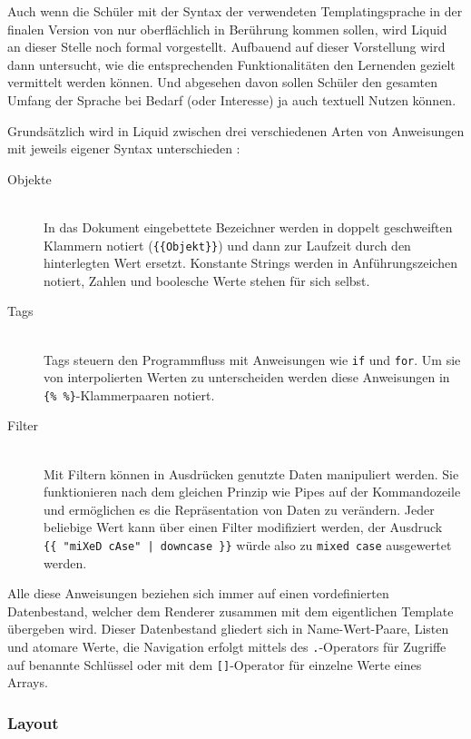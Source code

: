 Auch wenn die Schüler mit der Syntax der verwendeten Templatingsprache in der finalen Version von \idename nur oberflächlich in Berührung kommen sollen, wird Liquid an dieser Stelle noch formal vorgestellt. Aufbauend auf dieser Vorstellung wird dann untersucht, wie die entsprechenden Funktionalitäten den Lernenden gezielt vermittelt werden können. Und abgesehen davon sollen Schüler den gesamten Umfang der Sprache bei Bedarf (oder Interesse) ja auch textuell Nutzen können.

Grundsätzlich wird in Liquid zwischen drei verschiedenen Arten von Anweisungen mit jeweils eigener Syntax unterschieden \cite{liquid-introduction}:

\begin{description}
\item[Objekte] \hfill \\
  In das Dokument eingebettete Bezeichner werden in doppelt geschweiften Klammern notiert (\texttt{\{\{Objekt\}\}}) und dann zur Laufzeit durch den hinterlegten Wert ersetzt. Konstante Strings werden in Anführungszeichen notiert, Zahlen und boolesche Werte stehen für sich selbst.
\item[Tags] \hfill \\
  Tags steuern den Programmfluss mit Anweisungen wie \texttt{if} und \texttt{for}. Um sie von interpolierten Werten zu unterscheiden werden diese Anweisungen in \texttt{\{\% \%\}}-Klam\-mer\-paaren notiert.
\item[Filter] \hfill \\
  Mit Filtern können in Ausdrücken genutzte Daten manipuliert werden. Sie funktionieren nach dem gleichen Prinzip wie Pipes auf der Kommandozeile und ermöglichen es die Repräsentation von Daten zu verändern. Jeder beliebige Wert kann über einen Filter modifiziert werden, der Ausdruck \texttt{\{\{~"miXeD cAse"~|~downcase~\}\}} würde also zu \texttt{mixed case} ausgewertet werden.
\end{description}

Alle diese Anweisungen beziehen sich immer auf einen vordefinierten Datenbestand, welcher dem Renderer zusammen mit dem eigentlichen Template übergeben wird. Dieser Datenbestand gliedert sich in Name-Wert-Paare, Listen und atomare Werte, die Navigation erfolgt mittels des \texttt{.}-Operators für Zugriffe auf benannte Schlüssel oder mit dem \texttt{[]}-Operator für einzelne Werte eines Arrays.

\subsubsection{Layout}

